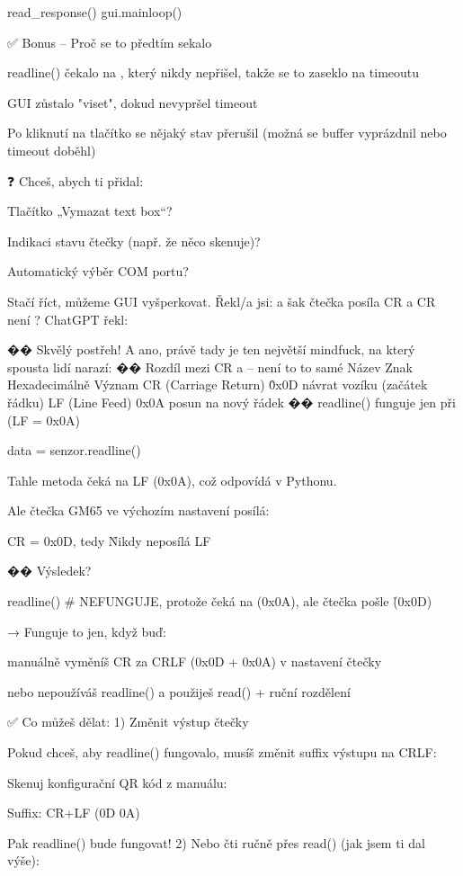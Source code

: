 read_response()
gui.mainloop()

✅ Bonus – Proč se to předtím sekalo

    readline() čekalo na \n, který nikdy nepřišel, takže se to zaseklo na timeoutu

    GUI zůstalo "viset", dokud nevypršel timeout

    Po kliknutí na tlačítko se nějaký stav přerušil (možná se buffer vyprázdnil nebo timeout doběhl)

❓ Chceš, abych ti přidal:

    Tlačítko „Vymazat text box“?

    Indikaci stavu čtečky (např. že něco skenuje)?

    Automatický výběr COM portu?

Stačí říct, můžeme GUI vyšperkovat.
Řekl/a jsi:
a šak čtečka posíla CR a CR není \n ?
ChatGPT řekl:

�� Skvělý postřeh! A ano, právě tady je ten největší mindfuck, na který spousta lidí narazí:
�� Rozdíl mezi CR a \n – není to to samé
Název	Znak	Hexadecimálně	Význam
CR (Carriage Return)	\r	0x0D	návrat vozíku (začátek řádku)
LF (Line Feed)	\n	0x0A	posun na nový řádek
�� readline() funguje jen při \n (LF = 0x0A)

data = senzor.readline()

Tahle metoda čeká na LF (0x0A), což odpovídá \n v Pythonu.

Ale čtečka GM65 ve výchozím nastavení posílá:

    CR = 0x0D, tedy \r

    Nikdy neposílá LF

�� Výsledek?

readline()  # NEFUNGUJE, protože čeká na \n (0x0A), ale čtečka pošle \r (0x0D)

→ Funguje to jen, když buď:

    manuálně vyměníš CR za CRLF (0x0D + 0x0A) v nastavení čtečky

    nebo nepoužíváš readline() a použiješ read() + ruční rozdělení

✅ Co můžeš dělat:
1) Změnit výstup čtečky

Pokud chceš, aby readline() fungovalo, musíš změnit suffix výstupu na CRLF:

    Skenuj konfigurační QR kód z manuálu:

        Suffix: CR+LF (0D 0A)

Pak readline() bude fungovat!
2) Nebo čti ručně přes read() (jak jsem ti dal výše):

